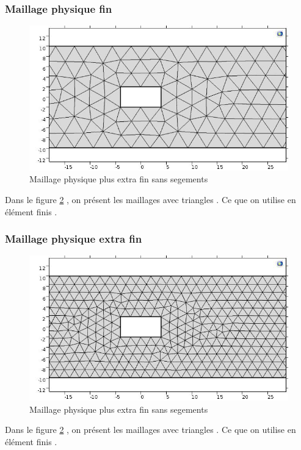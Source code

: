 \documentclass[a4paper,11pt]{report} %
\begin{document}
\subsubsection{Maillage physique fin}
\begin{figure}[!h]
\centering
\hspace*{0mm}\vfill
\begin{center} \includegraphics[width=1.\textwidth]{maillagefin.jpg} \end{center}
\vfill\hspace*{0mm}
\caption{Maillage physique plus extra fin sans segements }
\label{maillage_physique}
\end{figure}
Dans le figure \ref{maillage_physique} , on présent les maillages avec triangles . Ce que on utilise en élément finis .
\pagebreak
\subsubsection{Maillage physique extra fin}
\begin{figure}[!h]
\centering
\hspace*{0mm}\vfill
\begin{center} \includegraphics[width=1.\textwidth]{maillagextrafin.jpg} \end{center}
\vfill\hspace*{0mm}
\caption{Maillage physique plus extra fin sans segements }
\label{maillage_physique}
\end{figure}\pagebreak
Dans le figure \ref{maillage_physique} , on présent les maillages avec triangles . Ce que on utilise en élément finis .
\end{document}
